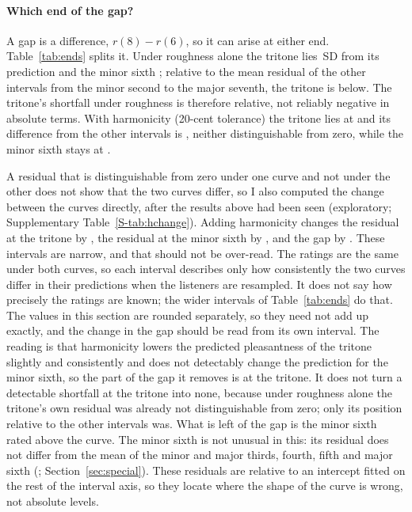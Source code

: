 \documentclass[11pt,a4paper]{article}
\newcommand{\SDu}{\,SD}
\begin{document}
\paragraph{Which end of the gap?}
A gap is a difference, $r(8)-r(6)$, so it can arise at either end. Table~\ref{tab:ends}
splits it. Under roughness alone the tritone lies \rpfSixHK\SDu{} from its prediction and the
minor sixth \rpfEightHK; relative to the mean residual of the other intervals from the minor
second to the major seventh, the tritone is \rpfTTOtherHK{} below. The tritone's shortfall
under roughness is therefore relative, not reliably negative in absolute terms. With
harmonicity (20-cent tolerance) the tritone lies at \rpfSixTw{} and its difference from the
other intervals is \rpfTTOtherTw, neither distinguishable from zero, while the minor sixth
stays at \rpfEightTw.

A residual that is distinguishable from zero under one curve and not under the other does
not show that the two curves differ, so I also computed the change between the curves
directly, after the results above had been seen (exploratory; Supplementary
Table~\ref{S-tab:hchange}). Adding harmonicity changes the residual at the tritone by
\hcSixTw{} \hcSixTwCI, the residual at the minor sixth by \hcEightTw{} \hcEightTwCI, and
the gap by \hcGapTw{} \hcGapTwCI. These intervals are narrow, and that should not be
over-read. The ratings are the same under both curves, so each interval describes only how
consistently the two curves differ in their predictions when the listeners are resampled. It
does not say how precisely the ratings are known; the wider intervals of
Table~\ref{tab:ends} do that. The values in this section are rounded separately, so they
need not add up exactly, and the change in the gap should be read from its own interval. The
reading is that harmonicity lowers the predicted pleasantness of the tritone slightly and
consistently and does not detectably change the prediction for the minor sixth, so the part
of the gap it removes is at the tritone. It does not turn a detectable shortfall at the
tritone into none, because under roughness alone the tritone's own residual was already not
distinguishable from zero; only its position relative to the other intervals was. What is
left of the gap is the minor sixth rated above the curve. The minor sixth is not unusual in
this: its residual does not differ from the mean of the minor and major thirds, fourth,
fifth and major sixth (\rpfMsixConsTw; Section~\ref{sec:special}). These residuals are
relative to an intercept fitted on the rest of the interval axis, so they locate where the
shape of the curve is wrong, not absolute levels.
\end{document}
